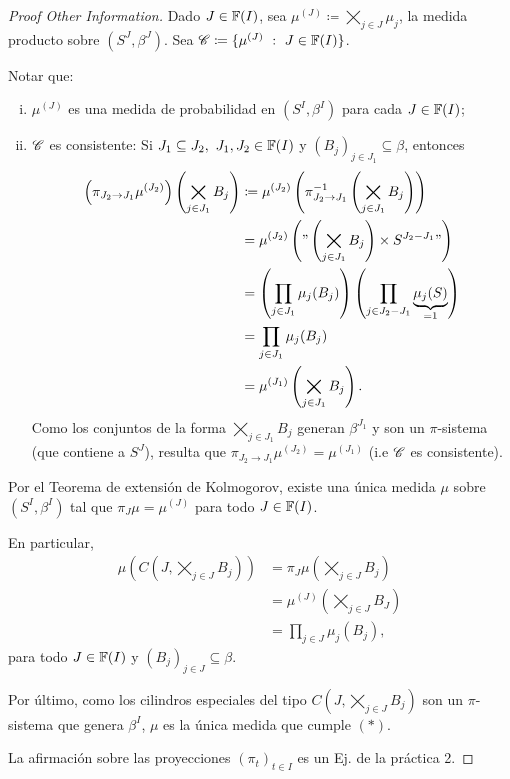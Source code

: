 \begin{proof}[Proof Other Information]
	Dado $J \in \mathbb{F}(I)$, sea $\mu^{(J)} \coloneq \bigtimes_{j \in J} \mu_{j}$, la medida producto sobre $(S^{J}, \beta^{J})$. Sea $\mathscr{C} \coloneq \{\mu^{(J)} \ : \ J \in \mathbb{F}(I)\}$. \par
	Notar que:
	\begin{enumerate}[(i)]
		\item $\mu^{(J)}$ es una medida de probabilidad en $(S^{I}, \beta^{I})$ para cada $J \in \mathbb{F}(I)$;

		\item $\mathscr{C}$ es consistente: Si $J_{1} \subseteq J_{2},\ J_{1},J_{2} \in \mathbb{F}(I)$ y $(B_{j})_{j \in J_{1}} \subseteq \beta$, entonces
		\begin{align*}
			\left( \pi_{J_{2} \to J_{1}} \mu^{(J_{2})} \right) \left( \bigtimes_{j \in J_{1}} B_{j} \right) &\coloneq \mu^{(J_{2})} \left( \pi_{J_{2} \to J_{1}}^{-1} \left( \bigtimes_{j \in J_{1}} B_{j} \right) \right) \\
			&= \mu^{(J_{2})} \left( " \left( \bigtimes_{j \in J_{1}} B_{j} \right) \times S^{J_{2} - J_{1}} " \right) \\
			&= \left( \prod_{j \in J_{1}} \mu_{j}(B_{j}) \right) \left( \prod_{j \in J_{2} - J_{1}} \underbrace{\mu_{j}(S)}_{= 1} \right) \\
			&= \prod_{j \in J_{1}} \mu_{j}(B_{j}) \\
			&= \mu^{(J_{1})} \left( \bigtimes_{j \in J_{1}} B_{j} \right)
		.\end{align*}
		Como los conjuntos de la forma $\bigtimes_{j \in J_{1}} B_{j}$ generan $\beta^{J_{1}}$ y son un $\pi$-sistema (que contiene a $S^{J}$), resulta que $\pi_{J_{2} \to J_{1}} \mu^{(J_{2})} = \mu^{(J_{1})}$ (i.e $\mathscr{C}$ es consistente).
	\end{enumerate}
	\par Por el Teorema de extensión de Kolmogorov, existe una única medida $\mu$ sobre $(S^{I}, \beta^{I})$ tal que $\pi_{J} \mu = \mu^{(J)}$ para todo $J \in \mathbb{F}(I)$. \par
	En particular,
	\begin{align*}
		\mu \left( C \left( J, \bigtimes_{j \in J} B_{j} \right) \right) &= \pi_{J} \mu \left( \bigtimes_{j \in J} B_{j} \right) \\
		&= \mu^{(J)} \left( \bigtimes_{j \in J} B_{J} \right) \\
		&= \prod_{j \in J} \mu_{j}(B_{j}) \tag{$*$}
	,\end{align*}
	para todo $J \in \mathbb{F}(I)$ y $(B_{j})_{j \in J} \subseteq \beta$. \par
	Por último, como los cilindros especiales del tipo $C(J, \bigtimes_{j \in J} B_{j})$ son un $\pi$-sistema que genera $\beta^{I}$, $\mu$ es la única medida que cumple $(*)$. \par
	La afirmación sobre las proyecciones $(\pi_{t})_{t \in I}$ es un Ej. de la práctica 2.
\end{proof}


